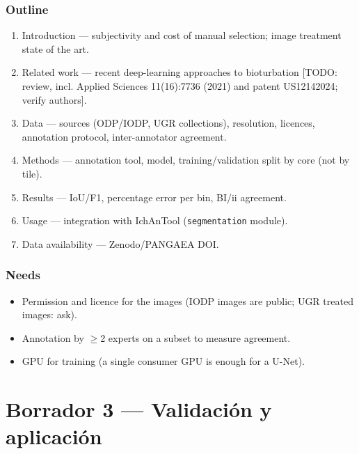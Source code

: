\documentclass[
  10pt,
]{article}
\providecommand{\tightlist}{%
  \setlength{\itemsep}{0pt}\setlength{\parskip}{0pt}}
\begin{document}
\hypertarget{outline}{%
\subsubsection{Outline}\label{outline}}

\begin{enumerate}
\def\labelenumi{\arabic{enumi}.}
\tightlist
\item
  Introduction --- subjectivity and cost of manual selection; image
  treatment state of the art.
\item
  Related work --- recent deep-learning approaches to bioturbation
  {[}TODO: review, incl. Applied Sciences 11(16):7736 (2021) and patent
  US12142024; verify authors{]}.
\item
  Data --- sources (ODP/IODP, UGR collections), resolution, licences,
  annotation protocol, inter-annotator agreement.
\item
  Methods --- annotation tool, model, training/validation split by core
  (not by tile).
\item
  Results --- IoU/F1, percentage error per bin, BI/ii agreement.
\item
  Usage --- integration with IchAnTool (\texttt{segmentation} module).
\item
  Data availability --- Zenodo/PANGAEA DOI.
\end{enumerate}

\hypertarget{needs}{%
\subsubsection{Needs}\label{needs}}

\begin{itemize}
\tightlist
\item[$\square$]
  Permission and licence for the images (IODP images are public; UGR
  treated images: ask).
\item[$\square$]
  Annotation by $\geq$2 experts on a subset to measure agreement.
\item[$\square$]
  GPU for training (a single consumer GPU is enough for a U-Net).
\end{itemize}

\newpage

\hypertarget{borrador-3-validaciuxf3n-y-aplicaciuxf3n}{%
\section{Borrador 3 --- Validación y
aplicación}\label{borrador-3-validaciuxf3n-y-aplicaciuxf3n}}
\end{document}
